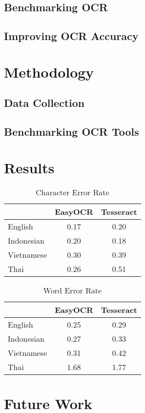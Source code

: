 \documentclass[12pt,oneside]{memoir}
\begin{document}
\section{Benchmarking OCR}

\section{Improving OCR Accuracy}

\chapter{Methodology}

\section{Data Collection}

\section{Benchmarking OCR Tools}
\parencite{smith-2013}

\chapter{Results}

\begin{table}[h]
    \centering
    \begin{tabular}{|l|c|c|}
        \hline
        & EasyOCR & Tesseract \\
        \hline
        English & 0.17 & 0.20\\
        Indonesian & 0.20& 0.18\\
        Vietnamese & 0.30& 0.39\\
        Thai & 0.26 & 0.51\\
        \hline
    \end{tabular}
    \caption{Character Error Rate}
\end{table}

\begin{table}[h]
    \centering
    \begin{tabular}{|l|c|c|}
        \hline
        & EasyOCR & Tesseract \\
        \hline
        English & 0.25 & 0.29\\
        Indonesian & 0.27& 0.33\\
        Vietnamese & 0.31& 0.42\\
        Thai & 1.68 & 1.77\\
        \hline
    \end{tabular}
    \caption{Word Error Rate}
\end{table}

\chapter{Future Work}

\printbibliography[title={References}]
\end{document}
